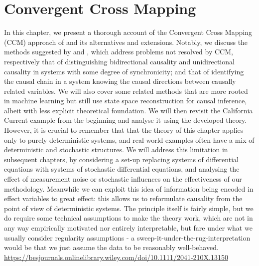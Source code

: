 \documentclass[11pt, a4paper]{memoir}
\theoremstyle{break}
\theoremstyle{break}
\theoremstyle{nonumberplain}
\begin{document}
\chapter{Convergent Cross Mapping}\label{chapTaken}
In this chapter, we present a thorough account of the Convergent Cross Mapping (CCM) approach of \cite{Sugihara} and its alternatives and extensions. Notably, we discuss the methods suggested by \cite{Ye2015} and \cite{Leng2020}, which address problems not resolved by CCM, respectively that of distinguishing bidirectional causality and unidirectional causality in systems with some degree of synchronicity; and that of identifying the causal chain in a system knowing the causal directions between causally related variables. We will also cover some related methods that are more rooted in machine learning but still use state space reconstruction for causal inference, albeit with less explicit theoretical foundation. We will then revisit the California Current example from the beginning and analyse it using the developed theory. However, it is crucial to remember that that the theory of this chapter applies only to purely deterministic systems, and real-world examples often have a mix of deterministic and stochastic structures. We will address this limitation in subsequent chapters, by considering a set-up replacing systems of differential equations with systems of stochastic differential equations, and analysing the effect of measurement noise or stochastic influences on the effectiveness of our methodology.
Meanwhile we can exploit this idea of information being encoded in effect variables to great effect: this allows us to reformulate causality from the point of view of deterministic systems. The principle itself is fairly simple, but we do require some technical assumptions to make the theory work, which are not in any way empirically motivated nor entirely interpretable, but fare under what we usually consider regularity assumptions - a sweep-it-under-the-rug-interpretation would be that we just assume the data to be reasonably well-behaved. 
\url{https://besjournals.onlinelibrary.wiley.com/doi/10.1111/2041-210X.13150}
\end{document}
